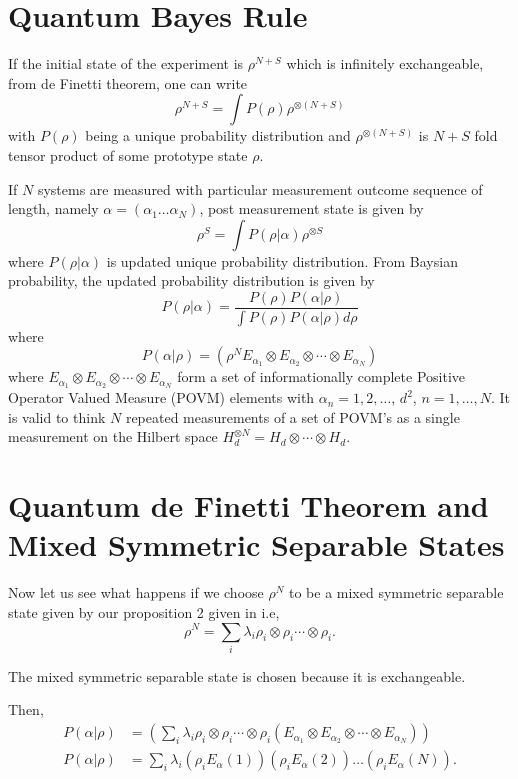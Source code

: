 \section{Quantum Bayes Rule}\label{chap27-sec4}

If the initial state of the experiment is  $\rho^{N+S}$ which is infinitely exchangeable, from de Finetti theorem, one can write 
$$
\rho^{N+S} = \int P(\rho) \rho^{\otimes(N+S)}
$$ 
with $P(\rho)$ being a unique probability distribution and $\rho^{\otimes(N+S)}$ is $N+S$ fold tensor product of some prototype state $\rho$.

If $N$ systems are measured with particular measurement outcome sequence of length, namely $\alpha = (\alpha_{1} \ldots \alpha_{N})$, post measurement state is given by 
$$
\rho^{S} = \int P(\rho|\alpha) \rho^{\otimes S}
$$ 
\cite{chap27-key10} where $P(\rho|\alpha)$ is updated unique probability distribution. From Baysian probability, the updated probability distribution is given by 
$$
P(\rho|\alpha) = \frac{P(\rho)P(\alpha|\rho)}{\int P(\rho)P(\alpha|\rho) d\rho}
$$ 
where
$$
P(\alpha|\rho) = (\rho^{N} E_{\alpha_{1}} \otimes E_{\alpha_{2}} \otimes \cdots \otimes E_{\alpha_{N}})
$$
where $E_{\alpha_{1}} \otimes E_{\alpha_{2}} \otimes \cdots \otimes E_{\alpha_{N}}$ form a set of informationally complete Positive Operator Valued Measure (POVM) elements with $\alpha_{n} = 1, 2, \ldots$, $d^{2}$, $n = 1, \ldots,N$. It is valid to think $N$ repeated measurements of a set of POVM's as a single measurement on the Hilbert space $H_{d}^{\otimes N} = H_{d} \otimes \cdots \otimes H_{d}$.

\section[Quantum de Finetti Theorem and Mixed Symmetric\hfil\break Separable States]{Quantum de Finetti Theorem and Mixed Symmetric Separable States}\label{chap27-sec5}

Now let us see what happens if we choose $\rho^{N}$ to be a mixed symmetric separable state given by our proposition 2 given in \cite{chap27-key11} i.e, 
$$
\rho^{N} = \sum_{i} \lambda_{i} \rho_{i} \otimes \rho_{i} \cdots \otimes \rho_{i}.
$$

The mixed symmetric separable state is chosen because it is exchangeable.

Then, 
\begin{align*}
P(\alpha|\rho) & = \left(\sum_{i} \lambda_{i} \rho_{i} \otimes \rho_{i} \cdots \otimes \rho_{i} (E_{\alpha_{1}} \otimes E_{\alpha_{2}} \otimes \cdots \otimes E_{\alpha_{N}})\right) \\
P(\alpha|\rho) & = \sum_{i} \lambda_{i} (\rho_{i} E_{\alpha}(1)) (\rho_{i} E_{\alpha}(2)) \ldots (\rho_{i} E_{\alpha}(N)).
\end{align*}

